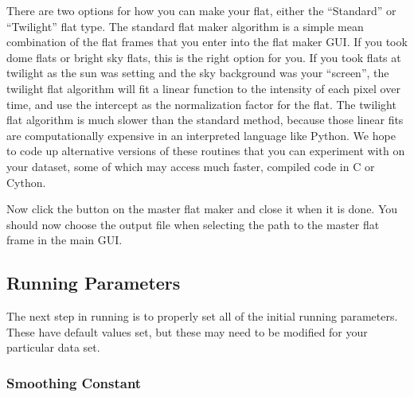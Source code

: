 \documentclass[a4paper]{article}
\begin{document}
There are two options for how you can make your flat, either  the ``Standard'' or ``Twilight'' flat type. The standard flat maker algorithm is a simple mean combination of the flat frames that you enter into the flat maker GUI. If you took dome flats or bright sky flats, this is the right option for you. If you took flats at twilight as the sun was setting and the sky background was your ``screen'', the twilight flat algorithm will fit a linear function to the intensity of each pixel over time, and use the intercept as the normalization factor for the flat. The twilight flat algorithm is much slower than the standard method, because those linear fits are computationally expensive in an interpreted language like Python. We hope to code up alternative versions of these routines that you can experiment with on your dataset, some of which may access much faster, compiled code in C or Cython.

Now click the  button on the master flat maker and close it when it is done. You should now choose the output file when selecting the path to the master flat frame in the main \oscaar GUI. 


\subsection{Running Parameters}
The next step in running \oscaar is to properly set all of the initial running parameters. These have default values set, but these may need to be modified for your particular data set.

\subsubsection{Smoothing Constant}
\end{document}
